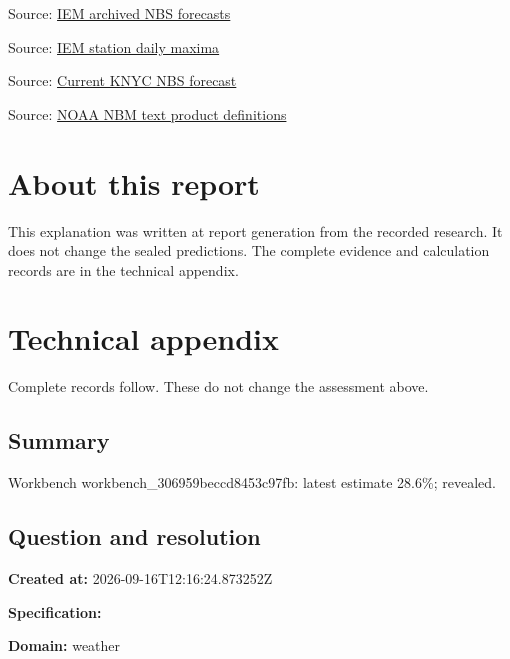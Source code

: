 \documentclass[11pt]{article}
\begin{document}
\par{\small Source: \href{https://mesonet.agron.iastate.edu/cgi-bin/request/mos.py?station=KNYC\&model=NBS\&sts=2026-08-16T00\%3A00Z\&ets=2026-09-16T00\%3A00Z\&format=csv}{IEM archived NBS forecasts}}
\par{\small Source: \href{https://mesonet.agron.iastate.edu/cgi-bin/request/daily.py?sts=2026-08-16\&ets=2026-09-15\&network=NY\_ASOS\&stations=NYC\&var=max\_temp\_f\&format=csv}{IEM station daily maxima}}
\par{\small Source: \href{https://mesonet.agron.iastate.edu/api/1/mos.json?station=KNYC\&model=NBS\&runtime=2026-09-16T06\%3A00Z}{Current KNYC NBS forecast}}
\par{\small Source: \href{https://vlab.noaa.gov/web/mdl/nbm-textcard-v5.0}{NOAA NBM text product definitions}}
\section*{\textcolor{epdarkgreen}{About this report}}
This explanation was written at report generation from the recorded research. It does not change the sealed predictions. The complete evidence and calculation records are in the technical appendix.


\clearpage
\appendix
\section{Technical appendix}
Complete records follow. These do not change the assessment above.
\subsection*{\textcolor{epdarkgreen}{Summary}}
Workbench workbench\_30\hspace{0pt}6959beccd845\hspace{0pt}3c97fb: latest estimate 28.6\%; revealed.


\subsection*{\textcolor{epdarkgreen}{Question and resolution}}
\par\noindent\textbf{Created at:} 2026-09-16T12:16:24.873252Z

\par\noindent\textbf{Specification:} \par \par\noindent\textbf{Domain:} weather
\end{document}
